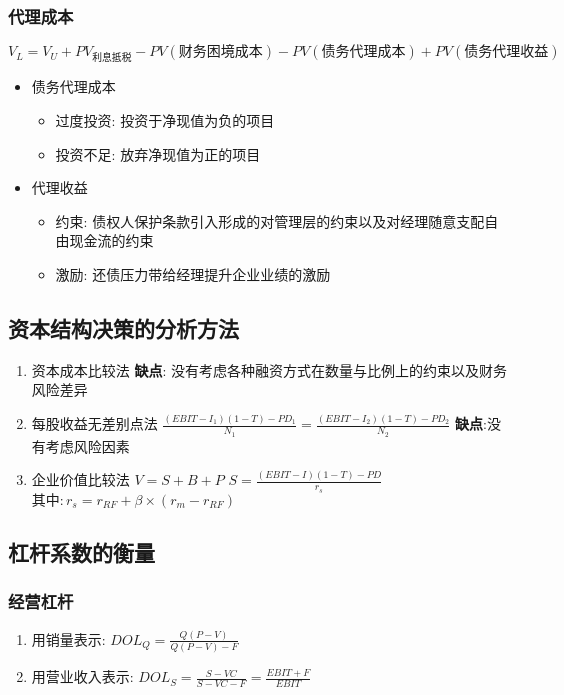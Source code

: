 \documentclass[11pt]{article}
\begin{document}
\subsubsection{代理成本}
\label{sec:orga723bb3}
\(V_{L}=V_{U}+PV_{利息抵税}-PV(财务困境成本)-PV(债务代理成本)+PV(债务代理收益)\)
\begin{itemize}
\item 债务代理成本
\begin{itemize}
\item 过度投资: 投资于净现值为负的项目
\item 投资不足: 放弃净现值为正的项目
\end{itemize}
\item 代理收益
\begin{itemize}
\item 约束: 债权人保护条款引入形成的对管理层的约束以及对经理随意支配自由现金流的约束
\item 激励: 还债压力带给经理提升企业业绩的激励
\end{itemize}
\end{itemize}
\subsection{资本结构决策的分析方法}
\label{sec:org0c50aef}
\begin{enumerate}
\item 资本成本比较法
\textbf{缺点}: 没有考虑各种融资方式在数量与比例上的约束以及财务风险差异
\item 每股收益无差别点法
\(\frac{(EBIT-I_{1})(1-T)-PD_{1}}{N_{1}}=\frac{(EBIT-I_{2})(1-T)-PD_{2}}{N_{2}}\)
\textbf{缺点}:没有考虑风险因素
\item 企业价值比较法
\(V = S +B +P\)
\(S=\frac{(EBIT-I)(1-T)-PD}{r_{s}}\)
\(其中:r_{s}=r_{RF}+\beta \times (r_{m}-r_{RF})\)
\end{enumerate}
\subsection{杠杆系数的衡量}
\label{sec:orgcb672da}
\subsubsection{经营杠杆}
\label{sec:orgaf2dead}
\begin{enumerate}
\item 用销量表示: \(DOL_{Q} = \frac{Q(P-V)}{Q(P-V)-F}\)
\item 用营业收入表示: \(DOL_{S}=\frac{S-VC}{S-VC-F}=\frac{EBIT+F}{EBIT}\)
\end{enumerate}
\end{document}
